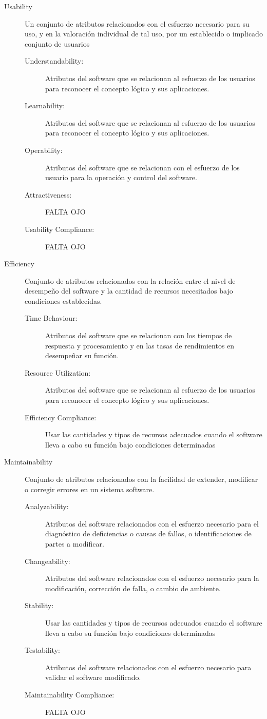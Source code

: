 \begin{description}
  \item[Usability] Un conjunto de atributos relacionados con el esfuerzo 
necesario para su uso, y en la valoración individual de tal uso, por 
un establecido o implicado conjunto de usuarios
	\SpecialItem
	\begin{description}
  		\item[Understandability:] Atributos del software que se 
relacionan al esfuerzo de los usuarios para reconocer el 
concepto lógico y sus aplicaciones.
  		\item[Learnability:] Atributos del software que se relacionan 
al esfuerzo de los usuarios para reconocer el concepto lógico 
y sus aplicaciones.
  		\item[Operability:] Atributos del software que se relacionan 
con el esfuerzo de los usuario para la operación 
y control del software.
  		\item[Attractiveness:] FALTA OJO
		\item[Usability Compliance:]  FALTA OJO
	\end{description}
	
  \item[Efficiency] Conjunto de atributos relacionados con la relación 
entre el nivel de desempeño del software y la cantidad de 
recursos necesitados bajo condiciones establecidas.
	\SpecialItem
	\begin{description}
  		\item[Time Behaviour:] Atributos del software que se 
relacionan con los tiempos de respuesta y procesamiento y en las 
tasas de rendimientos en desempeñar su función.
  		\item[Resource Utilization:] Atributos del software que se relacionan 
al esfuerzo de los usuarios para reconocer el concepto lógico 
y sus aplicaciones.
  		\item[Efficiency Compliance:] Usar las cantidades y tipos de 
recursos adecuados cuando el software lleva a cabo su función bajo 
condiciones determinadas
	\end{description}
	
  \item[Maintainability] Conjunto de atributos relacionados con la 
facilidad de extender, modificar o corregir errores en un sistema 
software.
	\SpecialItem
	\begin{description}
  		\item[Analyzability:] Atributos del software relacionados con 
el esfuerzo necesario para el diagnóstico de deficiencias o causas 
de fallos, o identificaciones de partes a modificar.
  		\item[Changeability:] Atributos del software relacionados 
con el esfuerzo necesario para la modificación, corrección de falla, 
o cambio de ambiente.
  		\item[Stability:] Usar las cantidades y tipos de 
recursos adecuados cuando el software lleva a cabo su función bajo 
condiciones determinadas
		\item[Testability:] Atributos del software relacionados con 
el esfuerzo necesario para validar el software modificado.
		\item[Maintainability Compliance:] FALTA OJO
	\end{description}
	

\end{description}
